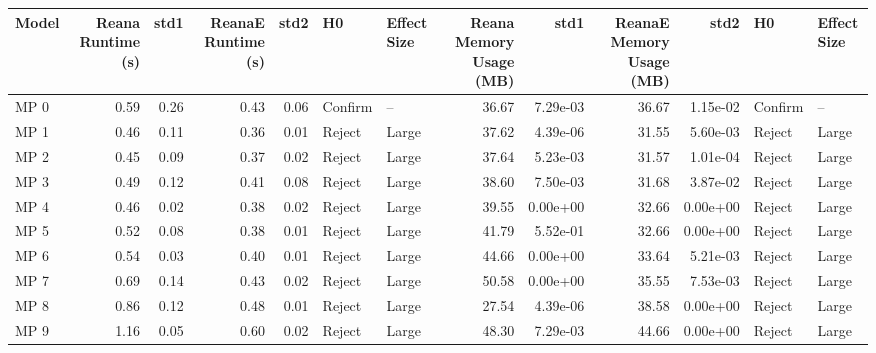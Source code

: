 \begin{tabular}{lrrrrllrrrrll}
\toprule
 Model &  Reana Runtime (s) &  std1 &  ReanaE Runtime (s) &  std2 &       H0 & Effect Size &  Reana Memory Usage (MB) &      std1 &  ReanaE Memory Usage (MB) &      std2 &       H0 & Effect Size \\
\midrule
  MP 0 &               0.59 &  0.26 &                0.43 &  0.06 &  Confirm &          -- &                    36.67 &  7.29e-03 &                     36.67 &  1.15e-02 &  Confirm &          -- \\
  MP 1 &               0.46 &  0.11 &                0.36 &  0.01 &   Reject &       Large &                    37.62 &  4.39e-06 &                     31.55 &  5.60e-03 &   Reject &       Large \\
  MP 2 &               0.45 &  0.09 &                0.37 &  0.02 &   Reject &       Large &                    37.64 &  5.23e-03 &                     31.57 &  1.01e-04 &   Reject &       Large \\
  MP 3 &               0.49 &  0.12 &                0.41 &  0.08 &   Reject &       Large &                    38.60 &  7.50e-03 &                     31.68 &  3.87e-02 &   Reject &       Large \\
  MP 4 &               0.46 &  0.02 &                0.38 &  0.02 &   Reject &       Large &                    39.55 &  0.00e+00 &                     32.66 &  0.00e+00 &   Reject &       Large \\
  MP 5 &               0.52 &  0.08 &                0.38 &  0.01 &   Reject &       Large &                    41.79 &  5.52e-01 &                     32.66 &  0.00e+00 &   Reject &       Large \\
  MP 6 &               0.54 &  0.03 &                0.40 &  0.01 &   Reject &       Large &                    44.66 &  0.00e+00 &                     33.64 &  5.21e-03 &   Reject &       Large \\
  MP 7 &               0.69 &  0.14 &                0.43 &  0.02 &   Reject &       Large &                    50.58 &  0.00e+00 &                     35.55 &  7.53e-03 &   Reject &       Large \\
  MP 8 &               0.86 &  0.12 &                0.48 &  0.01 &   Reject &       Large &                    27.54 &  4.39e-06 &                     38.58 &  0.00e+00 &   Reject &       Large \\
  MP 9 &               1.16 &  0.05 &                0.60 &  0.02 &   Reject &       Large &                    48.30 &  7.29e-03 &                     44.66 &  0.00e+00 &   Reject &       Large \\

\end{tabular}
